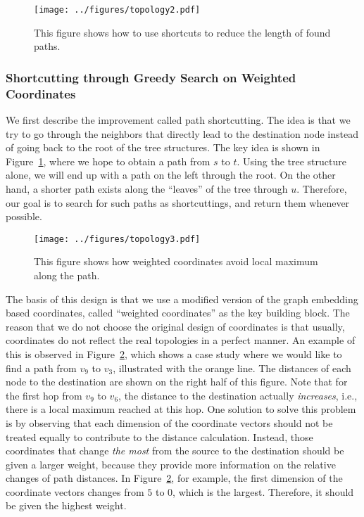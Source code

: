 \begin{figure}[t]
  \centering
  \texttt{[image: ../figures/topology2.pdf]}
  \caption{This figure shows how to use shortcuts to reduce the length of found paths.}
  \label{fig:shortcut}
  \vspace{-3mm}
\end{figure}


\subsubsection{Shortcutting through Greedy Search on Weighted Coordinates}

We first describe the improvement called path shortcutting. The idea is that we try to go through the neighbors that directly lead to the destination node instead of going back to the root of the tree structures. The key idea is shown in Figure~\ref{fig:shortcut}, where we hope to obtain a path from $s$ to $t$. Using the tree structure alone, we will end up with a path on the left through the root. On the other hand, a shorter path exists along the ``leaves'' of the tree through $u$. Therefore, our goal is to search for such paths as shortcuttings, and return them whenever possible.

\begin{figure}[t]
  \centering
  \texttt{[image: ../figures/topology3.pdf]}
  \caption{This figure shows how weighted coordinates avoid local maximum along the path.}
  \label{fig:weighted}
  \vspace{-3mm}
\end{figure}

The basis of this design is that we use a modified version of the graph embedding based coordinates, called ``weighted coordinates'' as the key building block. The reason that we do not choose the original design of coordinates is that usually, coordinates do not reflect the real topologies in a perfect manner. An example of this is observed in Figure~\ref{fig:weighted}, which shows a case study where we would like to find a path from $v_9$ to $v_3$, illustrated with the orange line. The distances of each node to the destination are shown on the right half of this figure. Note that for the first hop from $v_9$ to $v_6$, the distance to the destination actually \emph{increases}, i.e., there is a local maximum reached at this hop. One solution to solve this problem is by observing that each dimension of the coordinate vectors should not be treated equally to contribute to the distance calculation. Instead, those coordinates that change \emph{the most} from the source to the destination should be given a larger weight, because they provide more information on the relative changes of path distances. In Figure~\ref{fig:weighted}, for example, the first dimension of the coordinate vectors changes from $5$ to $0$, which is the largest. Therefore, it should be given the highest weight.

